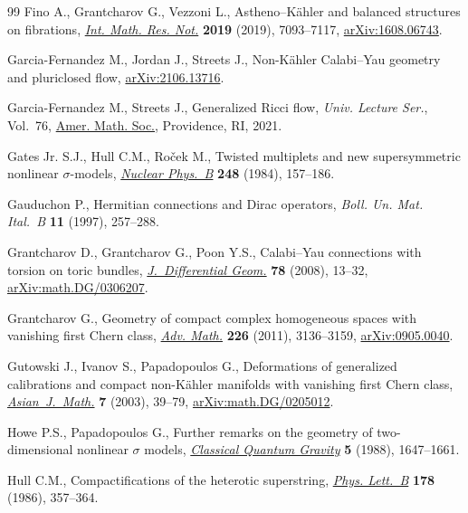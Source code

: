 \documentclass[pdftex]{sigma}
\numberwithin{equation}{section}
\begin{document}
\begin{thebibliography}{99}
Fino A., Grantcharov G., Vezzoni L., Astheno--{K}\"ahler and balanced
 structures on fibrations, \href{https://doi.org/10.1093/imrn/rnx337}{\textit{Int. Math. Res. Not.}} \textbf{2019} (2019),
 7093--7117, \href{https://arxiv.org/abs/1608.06743}{arXiv:1608.06743}.

Garcia-Fernandez M., Jordan J., Streets J., Non-{K}\"ahler {C}alabi--{Y}au
 geometry and pluriclosed flow, \href{https://arxiv.org/abs/2106.13716}{arXiv:2106.13716}.

Garcia-Fernandez M., Streets J., Generalized {R}icci flow, \textit{Univ.
 Lecture Ser.}, Vol.~76, \href{https://doi.org/10.1090/ulect/076}{Amer. Math. Soc.}, Providence, RI, 2021.

Gates Jr. S.J., Hull C.M., Ro\v{c}ek M., Twisted multiplets and new
 supersymmetric nonlinear {$\sigma$}-models, \href{https://doi.org/10.1016/0550-3213(84)90592-3}{\textit{Nuclear Phys.~B}}
 \textbf{248} (1984), 157--186.

Gauduchon P., Hermitian connections and {D}irac operators, \textit{Boll. Un.
 Mat. Ital.~B} \textbf{11} (1997), 257--288.

Grantcharov D., Grantcharov G., Poon Y.S., Calabi--{Y}au connections with
 torsion on toric bundles, \href{https://doi.org/10.4310/jdg/1197320602}{\textit{J.~Differential Geom.}} \textbf{78} (2008),
 13--32, \href{https://arxiv.org/abs/math.DG/0306207}{arXiv:math.DG/0306207}.

Grantcharov G., Geometry of compact complex homogeneous spaces with vanishing
 first {C}hern class, \href{https://doi.org/10.1016/j.aim.2010.10.005}{\textit{Adv. Math.}} \textbf{226} (2011), 3136--3159,
 \href{https://arxiv.org/abs/0905.0040}{arXiv:0905.0040}.

Gutowski J., Ivanov S., Papadopoulos G., Deformations of generalized
 calibrations and compact non-{K}\"ahler manifolds with vanishing first
 {C}hern class, \href{https://doi.org/10.4310/AJM.2003.v7.n1.a4}{\textit{Asian~J.~Math.}} \textbf{7} (2003), 39--79,
 \href{https://arxiv.org/abs/math.DG/0205012}{arXiv:math.DG/0205012}.

Howe P.S., Papadopoulos G., Further remarks on the geometry of two-dimensional
 nonlinear {$\sigma$} models, \href{https://doi.org/10.1088/0264-9381/5/12/014}{\textit{Classical Quantum Gravity}} \textbf{5}
 (1988), 1647--1661.

Hull C.M., Compactifications of the heterotic superstring, \href{https://doi.org/10.1016/0370-2693(86)91393-6}{\textit{Phys.
 Lett.~B}} \textbf{178} (1986), 357--364.


\end{thebibliography}
\end{document}
